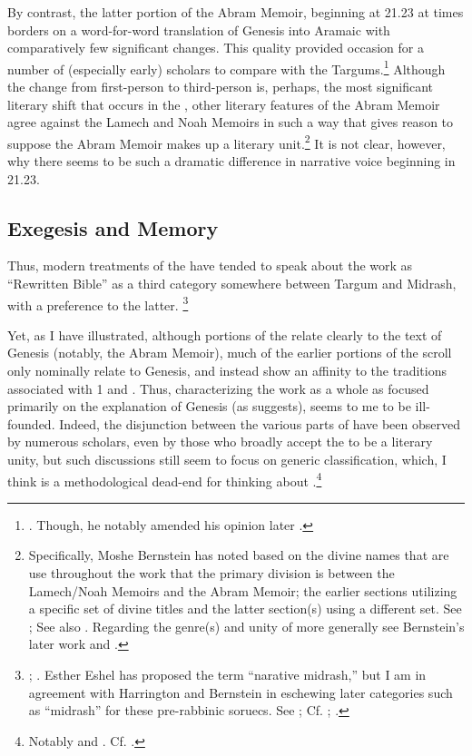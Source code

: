 

By contrast, the latter portion of the Abram Memoir, beginning at 21.23 at times borders on a word-for-word translation of Genesis into Aramaic with comparatively few significant changes. This quality provided occasion for a number of (especially early) scholars to compare \ga with the Targums.\footnote{\cite[193]{black1983}. Though, he notably amended his opinion later \cite*{black_black-fohrer1968}.} Although the change from first-person to third-person is, perhaps, the most significant literary shift that occurs in the \ga, other literary features of the Abram Memoir agree against the Lamech and Noah Memoirs in such a way that gives reason to suppose the Abram Memoir makes up a literary unit.\footnote{Specifically, Moshe Bernstein has noted based on the divine names that are use throughout the work that the primary division is between the Lamech/Noah Memoirs and the Abram Memoir; the earlier sections utilizing a specific set of divine titles and the latter section(s) using a different set. See \cite{bernstein_jbl2009}; See also \cite[97]{falk2007}. Regarding the genre(s) and unity of \ga more generally see Bernstein's later work \cite*{bernstein_berthelot-etal2010} and \cite*{bernstein_as2010}.} It is not clear, however, why there seems to be such a dramatic difference in narrative voice beginning in 21.23.

\subsection{Exegesis and Memory}

Thus, modern treatments of the \ga have tended to speak about the work as ``Rewritten Bible'' as a third category somewhere between Targum and Midrash, with a preference to the latter.%
%
\footnote{\cite{evans_revq1988}; \cite[19]{fitzmyer2004}. Esther Eshel has proposed the term ``narative midrash,'' but I am in agreement with Harrington and Bernstein in eschewing later categories such as ``midrash'' for these pre-rabbinic soruecs. See \cite[182]{eshel_roitman-etal2011}; Cf. \cite[242]{harrington_kraft-nickelsburg1986}; \cite[327 n. 33; 328--329]{bernstein_berthelot-etal2010}.}

Yet, as I have illustrated, although portions of the \ga relate clearly to the text of Genesis (notably, the Abram Memoir), much of the earlier portions of the scroll only nominally relate to Genesis, and instead show an affinity to the traditions associated with 1 \enoch and \jub. Thus, characterizing the work as a whole as focused primarily on the explanation of Genesis (as \vermes suggests), seems to me to be ill-founded. Indeed, the disjunction between the various parts of \ga have been observed by numerous scholars, even by those who broadly accept the \ga to be a literary unity, but such discussions still seem to focus on generic classification, which, I think is a methodological dead-end for thinking about \ga.\footnote{Notably \cite{bernstein_as2010} and \cite{falk2007}. Cf. \cite{eshel_roitman-etal2011}.}

